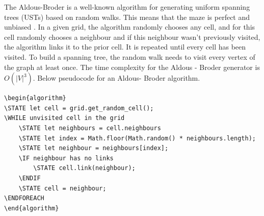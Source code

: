 The Aldous-Broder is a well-known algorithm for generating uniform spanning trees (USTs) based on random walks. This means that the maze is perfect and unbiased \cite{INune}. In a given grid, the algorithm randomly chooses any cell, and for this cell randomly chooses a neighbour and if this neighbour wasn’t previously visited, the algorithm links it to the prior cell. It is repeated until every cell has been visited. To build a spanning tree, the random walk needs to visit every vertex of the graph at least once. The time complexity for the Aldous - Broder generator is $O(|V|^3)$. Below pseudocode for an Aldous- Broder algorithm.
\newline
\begin{lstlisting}[caption={Pseudocode for an Aldous-Broder algorithm}]
\begin{algorithm}
\STATE let cell = grid.get_random_cell();
\WHILE unvisited cell in the grid
	\STATE let neighbours = cell.neighbours
	\STATE let index = Math.floor(Math.random() * neighbours.length);
	\STATE let neighbour = neighbours[index];
	\IF neighbour has no links
		\STATE cell.link(neighbour);
	\ENDIF
	\STATE cell = neighbour;
\ENDFOREACH
\end{algorithm}
\end{lstlisting}

